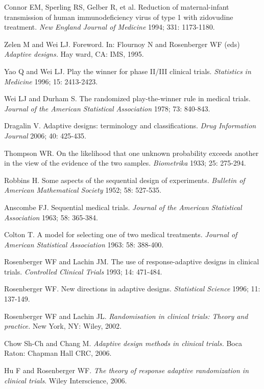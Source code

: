 \begin{thebibliography}

 Connor EM, Sperling RS, Gelber R, et al. Reduction of maternal-infant transmission of human immunodeficiency virus of type 1 with zidovudine treatment. \textit{New England Journal of Medicine} 1994; 331: 1173-1180.

 Zelen M and Wei LJ. Foreword. In: Flournoy N and Rosenberger WF (eds) \textit{Adaptive designs.}  Hay ward, CA: IMS, 1995.

 Yao Q and Wei LJ. Play the winner for phase II/III
clinical trials. \textit{Statistics in Medicine} 1996; 15: 2413-2423.

 Wei LJ and Durham S. The randomized play-the-winner rule in medical trials. \textit{Journal of the American Statistical Association} 1978; 73: 840-843.

 Dragalin V. Adaptive designs: terminology and classifications. \textit{Drug Information Journal} 2006; 40: 425-435.

 Thompson WR. On the likelihood that one unknown probability exceeds another in the view of the evidence of the two samples. \textit{Biometrika} 1933; 25: 275-294.

 Robbins H. Some aspects of the sequential design of experiments. \textit{Bulletin of American Mathematical Society} 1952; 58: 527-535.

 Anscombe FJ. Sequential medical trials. \textit{Journal of the American Statistical Association} 1963; 58: 365-384.

 Colton T. A model for selecting one of two medical
treatments. \textit{Journal of American Statistical Association} 1963: 58: 388-400.

 Rosenberger WF and Lachin JM. The use of response-adaptive designs in clinical trials. \textit{Controlled Clinical Trials} 1993; 14: 471-484.

 Rosenberger WF. New directions in adaptive designs. \textit{Statistical Science} 1996; 11: 137-149.

  Rosenberger WF and Lachin JL.  \textit{Randomisation in clinical trials: Theory and practice.} New York, NY: Wiley, 2002.

 Chow Sh-Ch and Chang M. \textit{Adaptive design methods in clinical trials.} Boca Raton: Chapman Hall CRC, 2006.

 Hu F and  Rosenberger WF. \textit{The theory of response adaptive randomization in clinical trials}. Wiley Interscience, 2006.


\end{thebibliography}
